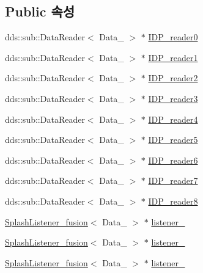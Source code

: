 \subsection*{Public 속성}
\begin{DoxyCompactItemize}
\item 
dds\+::sub\+::\+Data\+Reader$<$ Data\+\_ $>$ $\ast$ \hyperlink{classInputDataPort__F_a6b4b35818e400517815b7c6ba257f575}{I\+D\+P\+\_\+reader0}
\item 
dds\+::sub\+::\+Data\+Reader$<$ Data\+\_ $>$ $\ast$ \hyperlink{classInputDataPort__F_a79b0bd4a5163911b5fc61610fdd9c0f2}{I\+D\+P\+\_\+reader1}
\item 
dds\+::sub\+::\+Data\+Reader$<$ Data\+\_ $>$ $\ast$ \hyperlink{classInputDataPort__F_ae81ece0920bedb7e31fe559220a7aa3f}{I\+D\+P\+\_\+reader2}
\item 
dds\+::sub\+::\+Data\+Reader$<$ Data\+\_ $>$ $\ast$ \hyperlink{classInputDataPort__F_a3d951f807fddce8487ad9b31586a4ba5}{I\+D\+P\+\_\+reader3}
\item 
dds\+::sub\+::\+Data\+Reader$<$ Data\+\_ $>$ $\ast$ \hyperlink{classInputDataPort__F_a2257ff7fb24baade0c2f444b5a5605ab}{I\+D\+P\+\_\+reader4}
\item 
dds\+::sub\+::\+Data\+Reader$<$ Data\+\_ $>$ $\ast$ \hyperlink{classInputDataPort__F_a5fd5d86cc8ddc3221b09f0c362c00b79}{I\+D\+P\+\_\+reader5}
\item 
dds\+::sub\+::\+Data\+Reader$<$ Data\+\_ $>$ $\ast$ \hyperlink{classInputDataPort__F_a32834a466932265f79cf2b3bab07acd8}{I\+D\+P\+\_\+reader6}
\item 
dds\+::sub\+::\+Data\+Reader$<$ Data\+\_ $>$ $\ast$ \hyperlink{classInputDataPort__F_ae04efc90dc8587b312b240d549399894}{I\+D\+P\+\_\+reader7}
\item 
dds\+::sub\+::\+Data\+Reader$<$ Data\+\_ $>$ $\ast$ \hyperlink{classInputDataPort__F_a909a04c67500a9661ec84791b9739476}{I\+D\+P\+\_\+reader8}
\item 
\hyperlink{classSplashListener__fusion}{Splash\+Listener\+\_\+fusion}$<$ Data\+\_ $>$ $\ast$ \hyperlink{classInputDataPort__F_a1b73682b2bc71e7b9f85be1d6e5655da}{listener\+\_}
\item 
\hyperlink{classSplashListener__fusion}{Splash\+Listener\+\_\+fusion}$<$ Data\+\_ $>$ $\ast$ \hyperlink{classInputDataPort__F_a3c5532c1682ea7ce7aef4b3f50923f51}{listener\+\_}
\item 
\hyperlink{classSplashListener__fusion}{Splash\+Listener\+\_\+fusion}$<$ Data\+\_ $>$ $\ast$ \hyperlink{classInputDataPort__F_ac54eb8cc1b48c4e414add9fd1fed9725}{listener\+\_}

\end{DoxyCompactItemize}
